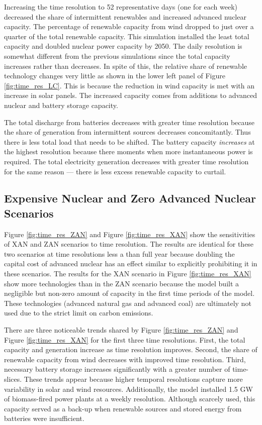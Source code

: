 Increasing the time resolution to 52 representative days (one for
each week) decreased the share of intermittent renewables and increased advanced
nuclear capacity. The percentage of renewable capacity from wind dropped to
just over a quarter of the total renewable capacity. This simulation installed
the least total capacity and doubled nuclear power capacity by 2050.
The daily resolution is somewhat different from the previous simulations
since the total capacity increases rather than decreases.
In spite of this, the relative share of renewable technology changes very little
as shown in the lower left panel of Figure \ref{fig:time_res_LC}.
This is because the reduction in wind capacity is met with an increase in solar
panels. The increased capacity comes from additions to advanced nuclear and battery
storage capacity.

The total discharge from batteries decreases with greater time resolution because
the share of generation from intermittent sources decreases concomitantly. Thus
there is less total load that needs to be shifted. The battery capacity \textit{increases}
at the highest resolution because there moments when more instantaneous power is
required. The total electricity generation decreases with greater time resolution
for the same reason --- there is less excess renewable capacity to curtail.

\subsection{Expensive Nuclear and Zero Advanced Nuclear Scenarios}

Figure \ref{fig:time_res_ZAN} and Figure \ref{fig:time_res_XAN} show the sensitivities of
\gls{XAN} and \gls{ZAN} scenarios to time resolution.
The results are identical for these two scenarios at time resolutions less a than
full year because doubling the capital cost of advanced nuclear has an effect similar
to explicitly prohibiting it in these scenarios. The results for the \gls{XAN}
scenario in Figure \ref{fig:time_res_XAN} show more technologies than in the
\gls{ZAN} scenario because the model built a negligible but non-zero amount of
capacity in the first time periods of the model. These technologies (advanced natural
gas and advanced coal) are ultimately not used due to the strict limit on carbon
emissions.

There are three noticeable trends shared by Figure \ref{fig:time_res_ZAN} and Figure
\ref{fig:time_res_XAN} for the first three time resolutions.
 First, the total capacity and generation increase as time resolution improves.
Second, the share of renewable capacity from wind decreases with improved time resolution.
Third, necessary battery storage increases significantly with a greater number of time-
slices. These trends appear because higher temporal resolutions capture more
variability in solar and wind resources. Additionally, the model installed 1.5 GW
of biomass-fired power plants at a weekly resolution. Although scarcely used,
this capacity served as a back-up when renewable sources and stored energy from
batteries were insufficient.

